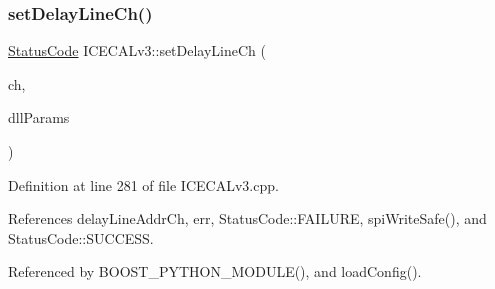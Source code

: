 \mbox{\label{classICECALv3_a14a7a29c9a3412c062f053cc616b860a}} 
\subsubsection{\texorpdfstring{set\+Delay\+Line\+Ch()}{setDelayLineCh()}}
{\footnotesize\ttfamily \hyperlink{classStatusCode}{Status\+Code} I\+C\+E\+C\+A\+Lv3\+::set\+Delay\+Line\+Ch (\begin{DoxyParamCaption}\item[{int}]{ch,  }\item[{Py\+Object $\ast$}]{dll\+Params }\end{DoxyParamCaption})}



Definition at line 281 of file I\+C\+E\+C\+A\+Lv3.\+cpp.



References delay\+Line\+Addr\+Ch, err, Status\+Code\+::\+F\+A\+I\+L\+U\+RE, spi\+Write\+Safe(), and Status\+Code\+::\+S\+U\+C\+C\+E\+SS.



Referenced by B\+O\+O\+S\+T\+\_\+\+P\+Y\+T\+H\+O\+N\+\_\+\+M\+O\+D\+U\+L\+E(), and load\+Config().


